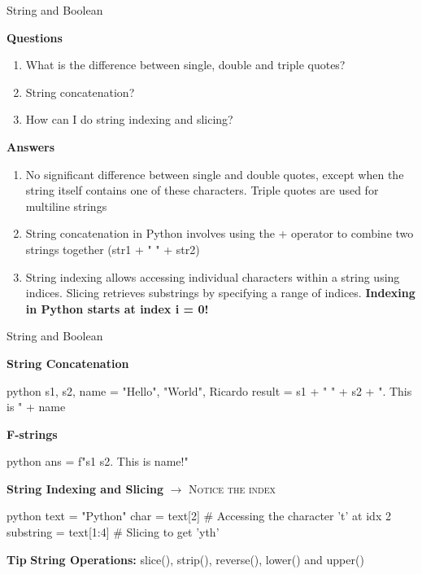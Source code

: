 \documentclass[
	11pt, 
]{beamer}
\begin{document}

\begin{frame}{String and Boolean}

\begin{block}{\textbf{Questions}}
\begin{enumerate}
    \item What is the difference between single, double and triple quotes?
    \item String concatenation?
    \item How can I do string indexing and slicing?
\end{enumerate}
\end{block}

\pause

\textbf{Answers}
\begin{enumerate}
    \item No significant difference between single and double quotes, except when the string itself contains one of these characters. Triple quotes are used for multiline strings
    \item String concatenation in Python involves using the + operator to combine two strings together (str1 + " " + str2)
    \item String indexing allows accessing individual characters within a string using indices. Slicing retrieves substrings by specifying a range of indices. \textbf{Indexing in Python starts at index i = 0!}
\end{enumerate}
    
\end{frame}



\begin{frame}[fragile]{String and Boolean}
\small %
 
\textbf{String Concatenation}   
\begin{mintedbox}{python}
s1, s2, name = "Hello", "World", Ricardo
result = s1 + " " + s2 + ". This is " + name 
\end{mintedbox}

\textbf{F-strings}   
\begin{mintedbox}{python}
ans = f"{s1} {s2}. This is {name}!"
\end{mintedbox}

\textbf{String Indexing and Slicing}
\hfill \textsc{$\rightarrow$ Notice the index}

\begin{mintedbox}{python}
text = "Python"
char = text[2] # Accessing the character 't' at idx 2
substring = text[1:4]  # Slicing to get 'yth'
\end{mintedbox}


\begin{exampleblock}{\textbf{Tip}}
    \textbf{String Operations:} slice(), strip(), reverse(), lower() and upper()
\end{exampleblock}

\end{frame}
\end{document}
